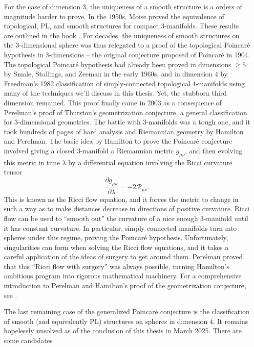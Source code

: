 For the case of dimension $3$, the uniqueness of a smooth structure is a orders of magnitude harder to prove. In the 1950s, Moise proved the equivalence of topological, PL, and smooth structures for compact $3$-manifolds. These results are outlined in the book \cite{moise1977geometric}. For decades, the uniqueness of smooth structures on the 3-dimensional sphere was thus relegated to a proof of the topological Poincar\'e hypothesis in 3-dimensions -- the original conjecture proposed of Poincar\'e in 1904. The topological Poincar\'e hypothesis had already been proved in dimensions $\geq 5$ by Smale, Stallings, and Zeeman in the early 1960s, and in dimension $4$ by Freedman's 1982 classification \cite{freedman1982} of simply-connected topological $4$-manifolds using many of the techniques we'll discuss in this thesis. Yet, the stubborn third dimension remained.
This proof finally came in 2003 as a consequence of Perelman's proof of Thurston's geometrization conjecture, a general classification for 3-dimensional geometries.
The battle with $3$-manifolds was a tough one, and it took hundreds of pages of hard analysis and Riemannian geometry by Hamilton and Perelman.
The basic idea by Hamilton to prove the Poincar\'e conjecture involved giving a
closed $3$-manifold a Riemannian metric $g_{\mu\nu}$, and then evolving this metric in time $\lambda$ by a differential equation involving the Ricci curvature tensor
\begin{equation}
	\frac{\partial g_{\mu\nu}}{\partial \lambda} = -2\mathcal{R}_{\mu\nu}.
\end{equation}
This is known as the Ricci flow equation, and it forces the metric to change in such a way as to make distances decrease in directions of positive curvature.
Ricci flow can be used to ``smooth out'' the curvature of a nice enough $3$-manifold until it has constant curvature. In particular, simply connected manifolds turn into spheres under this regime, proving the Poincar\'e hypothesis.
Unfortunately, singularities can form when solving the Ricci flow equations, and it takes a careful application of the ideas of surgery to get around them. Perelman proved that this ``Ricci flow with surgery'' was always possible, turning Hamilton's ambitious program into rigorous mathematical machinery. For a comprehensive introduction to Perelman and Hamilton's proof of the geometrization conjecture, see \cite{morgantian2007ricci}.

The last remaining case of the generalized Poincar\'e conjecture is the classification of smooth (and equivalently PL) structures on spheres in dimension $4$. It remains hopelessly unsolved as of the conclusion of this thesis in March 2025. There are some candidates

